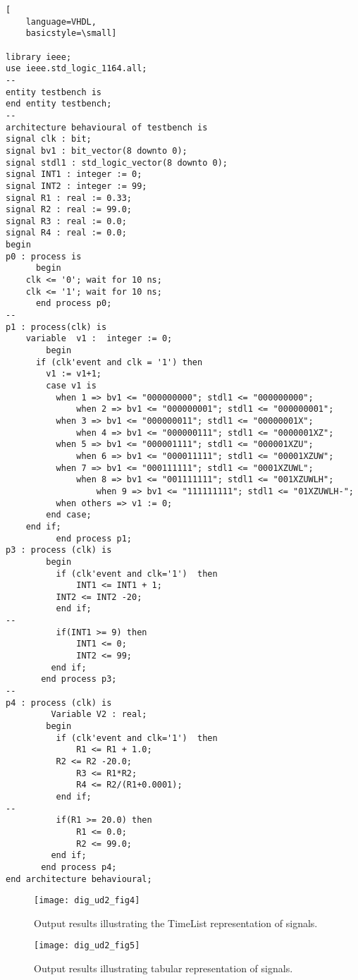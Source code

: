 \begin{lstlisting}[
    language=VHDL,
    basicstyle=\small]

library ieee;
use ieee.std_logic_1164.all;
--
entity testbench is
end entity testbench;
--
architecture behavioural of testbench is
signal clk : bit;
signal bv1 : bit_vector(8 downto 0);
signal stdl1 : std_logic_vector(8 downto 0);
signal INT1 : integer := 0;
signal INT2 : integer := 99;
signal R1 : real := 0.33;
signal R2 : real := 99.0;
signal R3 : real := 0.0;
signal R4 : real := 0.0;
begin
p0 : process is
      begin
	clk <= '0'; wait for 10 ns;
	clk <= '1'; wait for 10 ns;
      end process p0;
--
p1 : process(clk) is
	variable  v1 :  integer := 0;
      	begin
	  if (clk'event and clk = '1') then
		v1 := v1+1;
		case v1 is
		  when 1 => bv1 <= "000000000"; stdl1 <= "000000000";
	          when 2 => bv1 <= "000000001"; stdl1 <= "000000001";
		  when 3 => bv1 <= "000000011"; stdl1 <= "00000001X";
	          when 4 => bv1 <= "000000111"; stdl1 <= "0000001XZ";
		  when 5 => bv1 <= "000001111"; stdl1 <= "000001XZU";
	          when 6 => bv1 <= "000011111"; stdl1 <= "00001XZUW";
		  when 7 => bv1 <= "000111111"; stdl1 <= "0001XZUWL";
	          when 8 => bv1 <= "001111111"; stdl1 <= "001XZUWLH";
                  when 9 => bv1 <= "111111111"; stdl1 <= "01XZUWLH-";
		  when others => v1 := 0;
		end case;
	end if;
          end process p1;
p3 : process (clk) is
        begin
          if (clk'event and clk='1')  then
              INT1 <= INT1 + 1;
	      INT2 <= INT2 -20;
          end if;
--
          if(INT1 >= 9) then
              INT1 <= 0;
              INT2 <= 99;
         end if;
       end process p3;
--
p4 : process (clk) is
         Variable V2 : real;
        begin
          if (clk'event and clk='1')  then
              R1 <= R1 + 1.0;
	      R2 <= R2 -20.0;
              R3 <= R1*R2;
              R4 <= R2/(R1+0.0001);
          end if;
--
          if(R1 >= 20.0) then
              R1 <= 0.0;
              R2 <= 99.0; 
         end if;
       end process p4;
end architecture behavioural;
 \end{lstlisting} 
 
\begin{figure}[ht]   
  \centering 
  \texttt{[image: dig\_ud2\_fig4]} 
  \caption{Output results illustrating the TimeList representation of signals.} 
  \label{fig:ud2_fig4} 
\end{figure} 

\FloatBarrier  
\begin{figure}[ht]   
  \centering 
  \texttt{[image: dig\_ud2\_fig5]} 
  \caption{Output results illustrating tabular representation of signals.} 
  \label{fig:ud2_fig5} 
\end{figure} 


